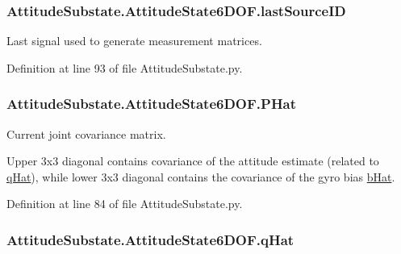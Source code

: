 \subsubsection[{\texorpdfstring{last\+Source\+ID}{lastSourceID}}]{\setlength{\rightskip}{0pt plus 5cm}Attitude\+Substate.\+Attitude\+State6\+D\+O\+F.\+last\+Source\+ID}\hypertarget{classAttitudeSubstate_1_1AttitudeState6DOF_a0161cc024a651de854100014872165af}{}\label{classAttitudeSubstate_1_1AttitudeState6DOF_a0161cc024a651de854100014872165af}


Last signal used to generate measurement matrices. 



Definition at line 93 of file Attitude\+Substate.\+py.

\subsubsection[{\texorpdfstring{P\+Hat}{PHat}}]{\setlength{\rightskip}{0pt plus 5cm}Attitude\+Substate.\+Attitude\+State6\+D\+O\+F.\+P\+Hat}\hypertarget{classAttitudeSubstate_1_1AttitudeState6DOF_a6aac27efa4d5962865f7d3f701c919ab}{}\label{classAttitudeSubstate_1_1AttitudeState6DOF_a6aac27efa4d5962865f7d3f701c919ab}


Current joint covariance matrix. 

Upper 3x3 diagonal contains covariance of the attitude estimate (related to \hyperlink{classAttitudeSubstate_1_1AttitudeState6DOF_a36a58a47280151dd544762d9a1d5c35d}{q\+Hat}), while lower 3x3 diagonal contains the covariance of the gyro bias \hyperlink{classAttitudeSubstate_1_1AttitudeState6DOF_a1b8eff7c89a7a03875dc04263da7ec18}{b\+Hat}. 

Definition at line 84 of file Attitude\+Substate.\+py.

\subsubsection[{\texorpdfstring{q\+Hat}{qHat}}]{\setlength{\rightskip}{0pt plus 5cm}Attitude\+Substate.\+Attitude\+State6\+D\+O\+F.\+q\+Hat}\hypertarget{classAttitudeSubstate_1_1AttitudeState6DOF_a36a58a47280151dd544762d9a1d5c35d}{}\label{classAttitudeSubstate_1_1AttitudeState6DOF_a36a58a47280151dd544762d9a1d5c35d}



